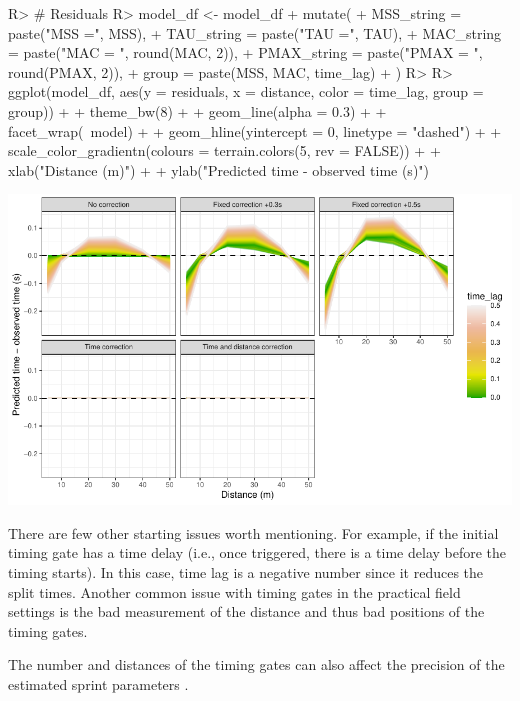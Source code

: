 \documentclass[
]{jss}
\begin{document}
\begin{CodeChunk}
\begin{CodeInput}
R> # Residuals
R> model_df <- model_df %
+   mutate(
+     MSS_string = paste("MSS =", MSS),
+     TAU_string = paste("TAU =", TAU),
+     MAC_string = paste("MAC = ", round(MAC, 2)),
+     PMAX_string = paste("PMAX = ", round(PMAX, 2)),
+     group = paste(MSS, MAC, time_lag)
+   )
R> 
R> ggplot(model_df, aes(y = residuals, x = distance, color = time_lag, group = group)) +
+   theme_bw(8) +
+   geom_line(alpha = 0.3) +
+   facet_wrap(~model) +
+   geom_hline(yintercept = 0, linetype = "dashed") +
+   scale_color_gradientn(colours = terrain.colors(5, rev = FALSE)) +
+   xlab("Distance (m)") +
+   ylab("Predicted time - observed time (s)")
\end{CodeInput}


\begin{center}\includegraphics[width=1\linewidth]{paper_files/figure-latex/unnamed-chunk-47-1} \end{center}

\end{CodeChunk}

There are few other starting issues worth mentioning. For example, if the initial timing gate has a time delay (i.e., once triggered, there is a time delay before the timing starts). In this case, time lag is a negative number since it reduces the split times. Another common issue with timing gates in the practical field settings is the bad measurement of the distance and thus bad positions of the timing gates.

The number and distances of the timing gates can also affect the precision of the estimated sprint parameters \citep{haugenPowerForceVelocityProfilingSprinting2020, haugenDifferenceStartImpact2012}.
\end{document}
